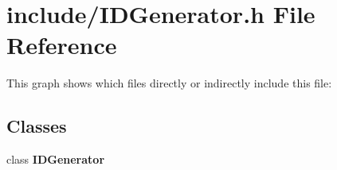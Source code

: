 \section{include/\+I\+D\+Generator.h File Reference}
\label{_i_d_generator_8h}
This graph shows which files directly or indirectly include this file\+:
\subsection*{Classes}
\begin{DoxyCompactItemize}
\item 
class \textbf{ I\+D\+Generator}
\end{DoxyCompactItemize}
